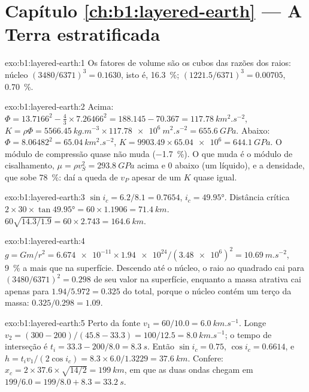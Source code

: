 \section*{Capítulo \ref{ch:b1:layered-earth} --- A Terra estratificada}

\begin{solution}{exo:b1:layered-earth:1}
Os fatores de volume são os cubos das razões dos raios: núcleo
$(3480/6371)^3 = 0.1630$, isto é, \qty{16.3}{\percent}; 
$(1221.5/6371)^3 = 0.00705$, \qty{0.70}{\percent}.
\end{solution}

\begin{solution}{exo:b1:layered-earth:2}
Acima: $\Phi = 13.7166^2 - \tfrac43\times7.26466^2 = 188.145 - 70.367 =
\qty{117.78}{km^2.s^{-2}}$, $K = \rho\Phi = \qty{5566.45}{kg.m^{-3}}\times
\qty{117.78e6}{m^2.s^{-2}} = \qty{655.6}{GPa}$. Abaixo: $\Phi = 8.06482^2 =
\qty{65.04}{km^2.s^{-2}}$, $K = 9903.49\times\num{65.04e6} = \qty{644.1}{GPa}$.
O módulo de compressão quase não muda (\qty{-1.7}{\percent}). O que muda é o
módulo de cisalhamento, $\mu = \rho v_S^2 = \qty{293.8}{GPa}$ acima e $0$ abaixo (um
líquido), e a densidade, que sobe \qty{78}{\percent}: daí a queda de
$v_P$ apesar de um $K$ quase igual.
\end{solution}

\begin{solution}{exo:b1:layered-earth:3}
$\sin i_c = 6.2/8.1 = 0.7654$, $i_c = \ang{49.95}$. Distância crítica
$2\times30\times\tan\ang{49.95} = 60\times1.1906 = \qty{71.4}{km}$.  $60\sqrt{14.3/1.9} = 60\times2.743 = \qty{164.6}{km}$.
\end{solution}

\begin{solution}{exo:b1:layered-earth:4}
$g = Gm/r^2 = \num{6.674e-11}\times\num{1.94e24}/(\num{3.48e6})^2 =
\qty{10.69}{m.s^{-2}}$, \qty{9}{\percent} a mais que na superfície. Descendo
até o núcleo, o raio ao quadrado cai para $(3480/6371)^2 = 0.298$ de seu valor na
superfície, enquanto a massa atrativa cai apenas para $1.94/5.972 = 0.325$ do total,
porque o núcleo contém um terço da massa: $0.325/0.298 = 1.09$.
\end{solution}

\begin{solution}{exo:b1:layered-earth:5}
Perto da fonte $v_1 = 60/10.0 = \qty{6.0}{km.s^{-1}}$. Longe
$v_2 = (300 - 200)/(45.8 - 33.3) = 100/12.5 = \qty{8.0}{km.s^{-1}}$; o
tempo de interseção é $t_i = 33.3 - 200/8.0 = \qty{8.3}{s}$. Então $\sin i_c =
0.75$, $\cos i_c = 0.6614$, e $h = t_i v_1/(2\cos i_c) = 8.3\times6.0/1.3229
= \qty{37.6}{km}$. Confere: $x_c = 2\times37.6\times\sqrt{14/2} = \qty{199}{km}$,
em que as duas ondas chegam em $199/6.0 = 199/8.0 + 8.3 = \qty{33.2}{s}$.
\end{solution}

